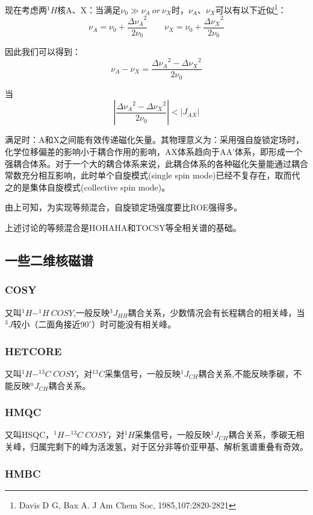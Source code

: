 现在考虑两$^1H$核A、X：当满足$\nu_0 \gg \nu_A \ or \ \nu_X$时，$\nu_A$、$\nu_X$可以有以下近似\footnote{Davis D G, Bax A. J Am Chem Soc, 1985,107:2820-2821}：
\[\nu_A= \nu_0 + \frac{{\Delta \nu_A}^2}{2 \nu_0} \qquad \nu_X= \nu_0 + \frac{{\Delta \nu_X}^2}{2 \nu_0}\]

因此我们可以得到：
\[\nu_A-\nu_X=\frac{{\Delta \nu_A}^2-{\Delta \nu_X}^2}{2 \nu_0}\]

当
\[\left | \frac{{\Delta \nu_A}^2-{\Delta \nu_X}^2}{2 \nu_0} \right |<|J_{AX}| \tag{i}\]

满足时：A和X之间能有效传递磁化矢量。其物理意义为：采用强自旋锁定场时，化学位移偏差的影响小于耦合作用的影响，AX体系趋向于AA'体系，即形成一个强耦合体系。对于一个大的耦合体系来说，此耦合体系的各种磁化矢量能通过耦合常数充分相互影响，此时单个自旋模式(single spin mode)已经不复存在，取而代之的是集体自旋模式(collective spin mode)。

由上可知，为实现等频混合，自旋锁定场强度要比ROE强得多。

上述讨论的等频混合是HOHAHA和TOCSY等全相关谱的基础。

\subsection{一些二维核磁谱}

\subsubsection{COSY}

又叫$^1H-^1H \ COSY$,一般反映$^3J_{HH}$耦合关系，少数情况会有长程耦合的相关峰，当$^3J$较小（二面角接近$90^{\circ}$）时可能没有相关峰。

\subsubsection{HETCORE}

又叫$^1H-^{13}C \ COSY$，对$^{13}C$采集信号，一般反映$^1J_{CH}$耦合关系,不能反映季碳，不能反映$^nJ_{CH}$耦合关系。

\subsubsection{HMQC}

又叫HSQC，$^1H-^{13}C \ COSY$，对$^{1}H$采集信号，一般反映$^1J_{CH}$耦合关系，季碳无相关峰，归属完剩下的峰为活泼氢，对于区分非等价亚甲基、解析氢谱重叠有奇效。

\subsubsection{HMBC}

